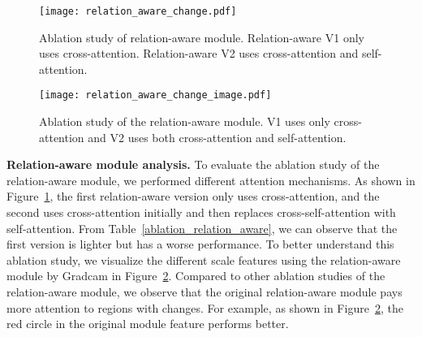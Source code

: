 \documentclass[letterpaper]{article} \usepackage{aaai23}  \usepackage{times}  \usepackage{helvet}  \usepackage{courier}  \usepackage[hyphens]{url}  \usepackage{graphicx} \urlstyle{rm} \def\UrlFont{\rm}  \usepackage{natbib}  \usepackage{caption} \frenchspacing  \setlength{\pdfpagewidth}{8.5in}  \setlength{\pdfpageheight}{11in}  \usepackage{algorithm}
\begin{document}
\begin{figure}[h]
\centering
\texttt{[image: relation\_aware\_change.pdf]}
\caption{ Ablation study of relation-aware module. Relation-aware V1 only uses cross-attention. Relation-aware V2 uses cross-attention and self-attention.}
\label{Relation_study}
\end{figure}

\begin{figure}[t]
\centering
\texttt{[image: relation\_aware\_change\_image.pdf]}
\caption{ Ablation study of the relation-aware module. V1 uses only cross-attention and V2 uses both cross-attention and self-attention.}
\vspace{0cm}
\label{Relation_study_image}
\end{figure}
\vspace{0.2cm}

\begin{table}[h]
\caption{ Ablation study of the relation-aware module, where CA denotes cross-attention, CSA the cross-self-attention, and SA the self-attention.}
\label{ablation_relation_aware}
\end{table}
\vspace{0.2cm}

\textbf{Relation-aware module analysis.} To evaluate the ablation study of the relation-aware module, we performed different attention mechanisms. As shown in Figure~\ref{Relation_study}, the first relation-aware version only uses cross-attention, and the second uses cross-attention initially and then replaces cross-self-attention with self-attention. From Table~\ref{ablation_relation_aware}, we can observe that the first version is lighter but has a worse performance. To better understand this ablation study, we visualize the different scale features using the relation-aware module by Gradcam in Figure~\ref{Relation_study_image}. Compared to other ablation studies of the relation-aware module, we observe that the original relation-aware module pays more attention to regions with changes. For example, as shown in Figure~\ref{Relation_study_image}, the red circle in the original module feature  performs better.  
\end{document}
